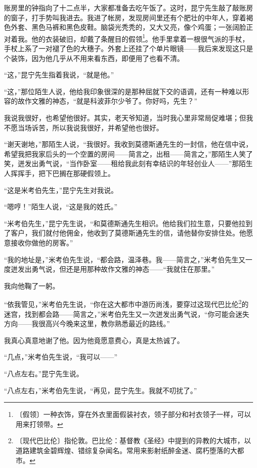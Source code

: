 \documentclass[12pt,UTF-8,openany]{ctexbook}
\begin{document}
\begin{large}
    账房里的钟指向了十二点半，大家都准备去吃午饭了。这时，昆宁先生敲了敲账房的窗子，打手势叫我进去。我进了帐房，发现房间里还有个肥壮的中年人，穿着褐色外套、黑色马裤和黑色皮鞋。脑袋光秃秃的，又大又亮，像个鸡蛋；一张阔脸正对着我。他的衣装破旧，却戴了条醒目的假领\footnote{〔假领〕一种衣饰，穿在外衣里面假装衬衣，领子部分和衬衣领子一样，可以用来打领带。}。他手里拿着一根很气派的手杖，手杖上系了一对褪了色的大穗子。外套上还挂了个单片眼镜——我后来发现这只是个装饰，因为他几乎从不用来看东西，即便用了也看不清。
    
    “这，”昆宁先生指着我说，“就是他。”
    
    “这，”那位陌生人说，他给我印象很深的是那种屈就下交的语调，还有一种难以形容的故作文雅的神态，“就是科波菲尔少爷了。你好吗，先生？”
    
    我说我很好，也希望他很好。其实，老天爷知道，当时我心里非常局促难堪；但我不愿当场诉苦，所以我说我很好，并希望他也很好。
    
    “谢天谢地，”那陌生人说，“我很好。我收到莫德斯通先生的一封信，他在信中说，希望我把我家后头的一个空置的房间——简言之，出租——简言之，”那陌生人笑了笑，迸发出勇气说，“当作卧室——租给我此刻有幸结识的年轻创业人——”那陌生人挥挥手，把下巴搁在那硬假领上。
    
    “这是米考伯先生，”昆宁先生对我说。
    
    “嗯哼！”陌生人说，“这是我的姓氏。”
    
    “米考伯先生，”昆宁先生说，“和莫德斯通先生相识。他给我们拉生意，只要他拉到了客户，我们就付他佣金，他收到了莫德斯通先生的信，请他替你安排住处。他愿意接收你做他的房客。”
    
    “我的地址是，”米考伯先生说，“都会路，温泽巷。我——简言之，”米考伯先生又一度迸发出勇气说，但还是用那种故作文雅的神态——“我就住在那里。”
    
    我向他鞠了一躬。
    
    “依我管见，”米考伯先生说，“你在这大都市中游历尚浅，要穿过这现代巴比伦\footnote{〔现代巴比伦〕指伦敦。巴比伦：基督教《圣经》中提到的异教的大城市，以道路建筑金碧辉煌、错综复杂闻名。常用来影射纸醉金迷、腐朽堕落的大都市。}的迷宫，找到都会路——简言之，”米考伯先生又一次迸发出勇气说，“你可能会迷失方向——我很高兴今晚来这里，教你熟悉最近的路线。”
    
    我真心真意地谢了他。因为他竟愿意费心，真是太热诚了。
    
    “几点，”米考伯先生说，“我可以——”
    
    “八点左右。”昆宁先生说。
    
    “八点左右，”米考伯先生说，“再见，昆宁先生。我就不叨扰了。”
    

\end{large}
\end{document}
